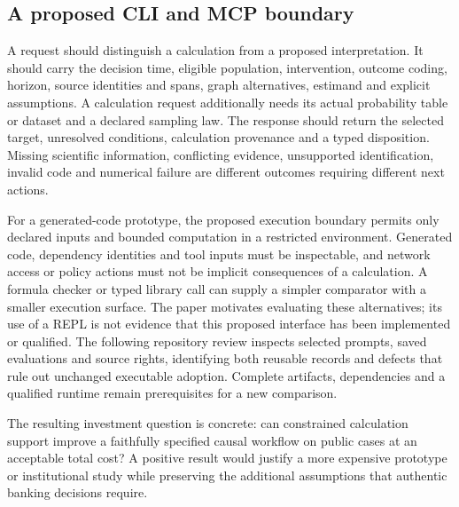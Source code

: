 \subsection{A proposed CLI and MCP boundary}
\label{exec21:prophets-contract}
A request should distinguish a calculation from a proposed interpretation. It
should carry the decision time, eligible population, intervention, outcome
coding, horizon, source identities and spans, graph alternatives, estimand and
explicit assumptions. A calculation request additionally needs its actual
probability table or dataset and a declared sampling law. The response should
return the selected target, unresolved conditions, calculation provenance and a
typed disposition. Missing scientific information, conflicting evidence,
unsupported identification, invalid code and numerical failure are different
outcomes requiring different next actions.

For a generated-code prototype, the proposed execution boundary permits only
declared inputs and bounded computation in a restricted environment. Generated
code, dependency identities and tool inputs must be inspectable, and network
access or policy actions must not be implicit consequences of a calculation.
A formula checker or typed library call can supply a simpler comparator with
a smaller execution surface. The paper motivates evaluating these alternatives;
its use of a REPL is not evidence that this proposed interface has been
implemented or qualified. The following repository review inspects selected prompts, saved evaluations and source rights, identifying both reusable records and defects that rule out unchanged executable adoption. Complete artifacts, dependencies and a qualified runtime remain prerequisites for a new comparison.
\citep{exec21_prophets}

The resulting investment question is concrete: can constrained calculation
support improve a faithfully specified causal workflow on public cases at an
acceptable total cost? A positive result would justify a more expensive
prototype or institutional study while preserving the additional assumptions
that authentic banking decisions require.
